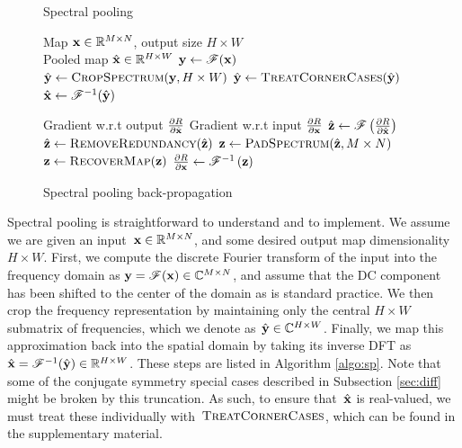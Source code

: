 \documentclass{article} %
\begin{document}
\begin{figure}[bbb!]
\begin{minipage}[t]{0.45\textwidth}
\begin{algorithm}[H]
\caption{Spectral pooling}
\label{algo:sp}
\begin{algorithmic}[1]
  \REQUIRE Map $\boldsymbol{\mathrm{x}}\in\mathbb{R}^{M\times N}$, output size $H\times W$
  \\[0.015cm]
  \ENSURE Pooled map $\hat{\boldsymbol{\mathrm{x}}}\in\mathbb{R}^{H\times W}$
  \STATE $\boldsymbol{\mathrm{y}} \leftarrow \mathscr{F}(\boldsymbol{\mathrm{x}})$
  \STATE $\hat{\boldsymbol{\mathrm{y}}} \leftarrow \textsc{CropSpectrum}(\boldsymbol{\mathrm{y}}, H\times W)$
  \STATE $\hat{\boldsymbol{\mathrm{y}}} \leftarrow \textsc{TreatCornerCases}(\hat{\boldsymbol{\mathrm{y}}})$
  \STATE $\hat{\boldsymbol{\mathrm{x}}} \leftarrow \mathscr{F}^{-1}(\hat{\boldsymbol{\mathrm{y}}})$
  \\[0.4cm]
\end{algorithmic}
\end{algorithm}
\end{minipage}
 \hfill
 \begin{minipage}[t]{0.5\textwidth}
 \begin{algorithm}[H]
\caption{Spectral pooling back-propagation}
\label{algo:sp_grad}
\begin{algorithmic}[1]
\footnotesize
  \REQUIRE Gradient w.r.t output $\frac{\partial R}{\partial \hat{\boldsymbol{\mathrm{x}}}}$
  \ENSURE Gradient w.r.t input $\frac{\partial R}{\partial \boldsymbol{\mathrm{x}}}$
  \STATE $\hat{\boldsymbol{\mathrm{z}}} \leftarrow \mathscr{F}\left(\frac{\partial R}{\partial \hat{\boldsymbol{\mathrm{x}}}}\right)$
  \STATE $\hat{\boldsymbol{\mathrm{z}}} \leftarrow \textsc{RemoveRedundancy}(\hat{\boldsymbol{\mathrm{z}}})$
  \STATE $\boldsymbol{\mathrm{z}} \leftarrow \textsc{PadSpectrum}(\hat{\boldsymbol{\mathrm{z}}}, M\times N)$
  \STATE $\boldsymbol{\mathrm{z}} \leftarrow \textsc{RecoverMap}(\boldsymbol{\mathrm{z}})$
  \STATE $\frac{\partial R}{\partial \boldsymbol{\mathrm{x}}} \leftarrow \mathscr{F}^{-1}\left(\boldsymbol{\mathrm{z}}\right)$
\end{algorithmic}
\end{algorithm}
 \end{minipage}
\end{figure}

Spectral pooling is straightforward to understand and to implement. We assume we are given an input~${\boldsymbol{\mathrm{x}}\in\mathbb{R}^{M\times N}}$, and some desired output map dimensionality ${H\times W}$. First, we compute the discrete Fourier transform of the input into the frequency domain as ${\boldsymbol{\mathrm{y}} = \mathscr{F}(\boldsymbol{\mathrm{x}})\in\mathbb{C}^{M\times N}}$, and assume that the DC component has been shifted to the center of the domain as is standard practice. We then crop the frequency representation by maintaining only the central ${H\times W}$ submatrix of frequencies, which we denote as~${\hat{\boldsymbol{\mathrm{y}}}\in\mathbb{C}^{H\times W}}$.  Finally, we map this approximation back into the spatial domain by taking its inverse DFT as~${\hat{\boldsymbol{\mathrm{x}}} = \mathscr{F}^{-1}(\hat{\boldsymbol{\mathrm{y}}})\in\mathbb{R}^{H\times W}}$.  These steps are listed in Algorithm \ref{algo:sp}.  Note that some of the conjugate symmetry special cases described in Subsection \ref{sec:diff} might be broken by this truncation. As such, to ensure that~$\hat{\boldsymbol{\mathrm{x}}}$ is real-valued, we must treat these individually with~$\textsc{TreatCornerCases}$, which can be found in the supplementary material. 
\end{document}
